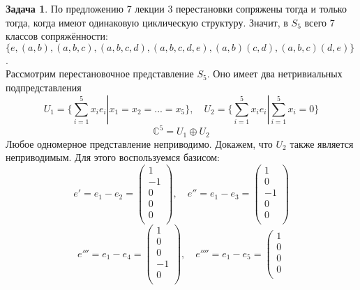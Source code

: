 \documentclass[12pt]{article}
\theoremstyle{definition}
\newtheorem{zad}{Задача}[section]
\begin{document}
\begin{zad}
    По предложению 7 лекции 3 перестановки сопряжены тогда и только тогда, когда имеют одинаковую циклическую структуру. Значит, в $S_5$ всего 7 классов сопряжённости: $\{e,(a,b),(a,b,c),(a,b,c,d),(a,b,c,d,e),(a,b)(c,d),(a,b,c)(d,e)\}$.\\
    Рассмотрим перестановочное представление $S_5$. Оно имеет два нетривиальных подпредставления
    \begin{equation}
        U_1=\{\sum\limits_{i=1}^5 x_ie_i|x_1=x_2=...=x_5\},\quad U_2=\{\sum\limits_{i=1}^5 x_ie_i|\sum\limits_{i=1}^5x_i=0\}
    \end{equation}
    \begin{equation}
        \mathbb{C}^5=U_1\oplus U_2
    \end{equation}
    Любое одномерное представление неприводимо. Докажем, что $U_2$ также является неприводимым. Для этого воспользуемся базисом:
    \begin{equation}
        e'=e_1-e_2=\left(
    \begin{array}{c}
    1\\
    -1\\
    0\\
    0\\
    0\\
    \end{array}
    \right),\quad e''=e_1-e_3=\left(
    \begin{array}{c}
    1\\
    0\\
    -1\\
    0\\
    0\\
    \end{array}
    \right)
    \end{equation}
    \begin{equation}
    e'''=e_1-e_4=\left(
    \begin{array}{c}
    1\\
    0\\
    0\\
    -1\\
    0\\
    \end{array}
    \right),\quad e''''=e_1-e_5=\left(
    \begin{array}{c}
    1\\
    0\\
    0\\
    0\\

\end{array}
\end{equation}
\end{zad}
\end{document}
